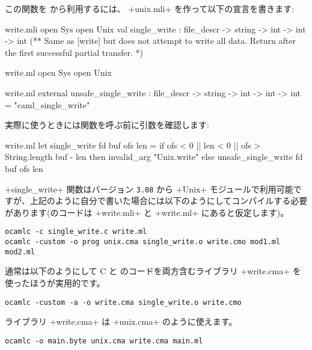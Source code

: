 この関数を \ocaml から利用するには、 \ml+unix.mli+ を作って以下の宣言を書きます:
%
\begin{codefile}{write.mli}
open Sys
open Unix
val single_write : file_descr -> string -> int -> int -> int
(** Same as [write] but does not attempt to write all data. Return after
the first successful partial transfer. *)
\end{codefile}
%
\begin{codefile}{write.ml}
open Sys
open Unix
\end{codefile}
%
\begin{listingcodefile}{write.ml}
external unsafe_single_write :
  file_descr -> string -> int -> int -> int = "caml_single_write"
\end{listingcodefile}
%
実際に使うときには関数を呼ぶ前に引数を確認します:
\begin{listingcodefile}{write.ml}
let single_write fd buf ofs len =
  if ofs < 0 || len < 0 || ofs > String.length buf - len
  then invalid_arg "Unix.write"
  else unsafe_single_write fd buf ofs len
\end{listingcodefile}
%
\ml+single_write+ 関数はバージョン \texttt{3.08} から \ml+Unix+ モジュールで利用可能ですが、上記のように自分で書いた場合には以下のようにしてコンパイルする必要があります(\ocaml のコードは \ml+write.mli+ と \ml+write.ml+ にあると仮定します)。
%
\begin{lstlisting}
ocamlc -c single_write.c write.ml
ocamlc -custom -o prog unix.cma single_write.o write.cmo mod1.ml mod2.ml
\end{lstlisting}
%
通常は以下のようにして C と \ocaml のコードを両方含むライブラリ \ml+write.cma+ を使ったほうが実用的です。
%
\begin{lstlisting}
ocamlc -custom -a -o write.cma single_write.o write.cmo
\end{lstlisting}
%
ライブラリ \ml+write.cma+ は \ml+unix.cma+ のように使えます。
%
\begin{lstlisting}
ocamlc -o main.byte unix.cma write.cma main.ml
\end{lstlisting}

